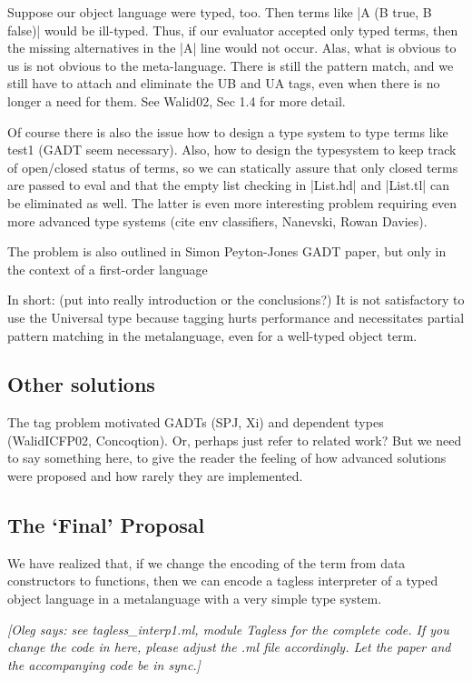 \documentclass[preprint]{sigplanconf}
\newcommand{\oleg}[1]{{\it [Oleg says: #1]}}
\begin{document}
Suppose our object language were typed, too. Then terms like
|A (B true, B false)| would be ill-typed. Thus, if our evaluator
accepted only typed terms, then the missing alternatives in the |A|
line would not occur. Alas, what is obvious to us is not obvious to
the meta-language. There is still the pattern match, and we still have
to attach and eliminate the UB and UA tags, even when there is no
longer a need for them. See Walid02, Sec 1.4 for more detail.

Of course there is also the issue how to design a type system to type
terms like test1 (GADT seem necessary). Also, how to design the
typesystem to keep track of open/closed status of terms, so we can
statically assure that only closed terms are passed to eval and that
the empty list checking in |List.hd| and |List.tl| can be eliminated
as well. The latter is even more interesting problem requiring even
more advanced type systems (cite env classifiers, Nanevski, Rowan
Davies).

The problem is also outlined in Simon Peyton-Jones GADT paper, but
only in the context of a first-order language

In short: (put into really introduction or the conclusions?)
It is not satisfactory
to use the Universal type because tagging hurts performance and
necessitates partial pattern matching in the metalanguage, even for a
well-typed object term.  


\subsection{Other solutions}
The tag problem motivated GADTs (SPJ, Xi) and dependent types
(WalidICFP02, Concoqtion). Or, perhaps just refer to related work?
But we need to say something here, to give the reader the feeling of
how advanced solutions were proposed and how rarely they are implemented.


\subsection{The `Final' Proposal}
We have realized that, if we change the encoding of the term from data
constructors to functions, then we can encode a tagless interpreter of a
typed object language in a metalanguage with a very simple type system.

\oleg{see tagless\_interp1.ml, module Tagless for the complete code.
If you change the code in here, please adjust the .ml file
accordingly. Let the paper and the accompanying code be in sync.}
\end{document}
